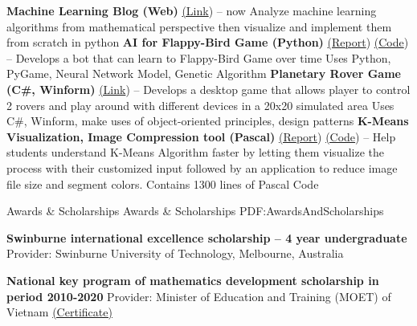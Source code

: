 \documentclass[letterpaper,MMMyyyy,nonstopmode]{simpleresumecv}
\begin{document}
\begin{Body}
\BulletItem
\textbf{Machine Learning Blog (Web)} \href{https://dunglai.github.io}{(\color{blue}Link})
\hfill
{} --
now
\SubBulletItem Analyze machine learning algorithms from mathematical perspective then visualize and implement them from scratch in python
\Gap\Gap\Gap
\BulletItem
\textbf{AI for Flappy-Bird Game (Python)} \href{https://dunglai.github.io/public/post-assets/FlappyBirdAI/report.pdf}{(\color{blue}Report}) \href{https://github.com/DungLai/AI-FlappyBird}{(\color{blue}Code})
\hfill
{} --
\SubBulletItem Develops a bot that can learn to Flappy-Bird Game over time
\SubBulletItem Uses Python, PyGame, Neural Network Model, Genetic Algorithm
\Gap\Gap\Gap
\BulletItem
\textbf{Planetary Rover Game (C\#, Winform)} \href{https://dunglai.github.io/2017/05/27/Planetary-Rover/}{(\color{blue}Link})
\hfill
{} --
\SubBulletItem Develops a desktop game that allows player to control 2 rovers and play around with different devices in a 20x20 simulated area
\SubBulletItem Uses C\#, Winform, make uses of object-oriented principles, design patterns
\Gap\Gap\Gap
\BulletItem
\textbf{K-Means Visualization, Image Compression tool (Pascal)} \href{https://dunglai.github.io/public/post-assets/Kmeans/Report.pdf}{(\color{blue}Report}) \href{https://github.com/DungLai/Image-Compression-Segmentation}{(\color{blue}Code})
\hfill
{} --
\SubBulletItem Help students understand K-Means Algorithm faster by letting them visualize the process with their customized input followed by an application to reduce image file size and segment colors.
\SubBulletItem Contains 1300 lines of Pascal Code



\Section
{Awards \&\newline
Scholarships}
{Awards \& Scholarships}
{PDF:AwardsAndScholarships}

\BulletItem
\textbf{Swinburne international excellence scholarship – 4 year undergraduate}
\hfill
{}
\SubBulletItem Provider: Swinburne University of Technology, Melbourne, Australia

\Gap\Gap\Gap
\BulletItem
\textbf{National key program of mathematics development scholarship in period 2010-2020}
\hfill
{}
\SubBulletItem Provider: Minister of Education and Training (MOET) of Vietnam \href{https://dunglai.github.io/public/post-assets/About/CVLatex/MathCert.png}{(\color{blue}Certificate)}


\end{Body}
\end{document}
